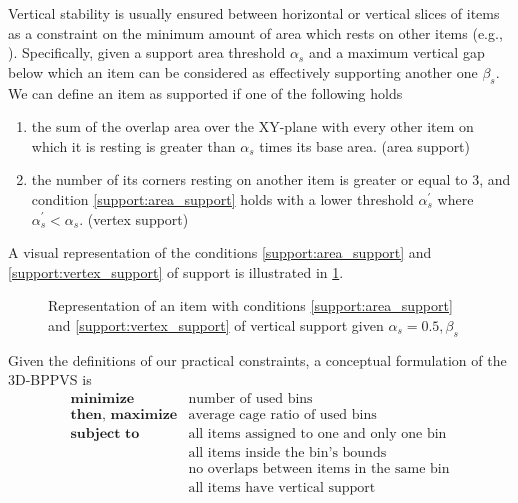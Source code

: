 Vertical stability is usually ensured between horizontal or vertical slices of items as a constraint on the minimum amount of area which rests on other items (e.g., \cite{GZARA20201062,kurpel2020exact,paquay2016mixed}).
Specifically, given a support area threshold $\alpha_s$ and a maximum vertical gap below which an item can be considered as effectively supporting another one $\beta_s$. We can define an item as supported if one of the following holds
\begin{enumerate}
    \item the sum of the overlap area over the XY-plane with every other item on which it is resting is greater than $\alpha_s$ times its base area. (area support) \label{support:area_support}
    \item the number of its corners resting on another item is greater or equal to 3, and condition \ref{support:area_support} holds with a lower threshold $\alpha^\prime_s$ where $\alpha^\prime_s < \alpha_s$. (vertex support) \label{support:vertex_support}
\end{enumerate}
A visual representation of the conditions \ref{support:area_support} and \ref{support:vertex_support} of support is illustrated in \cref{fig:support}.

\begin{figure}[H]
    \scalebox{0.55}{%
    
    }
    \caption{Representation of an item with conditions \ref{support:area_support} and \ref{support:vertex_support} of vertical support given $\alpha_s = 0.5, \beta_s$}
    \label{fig:support}
\end{figure}

\newpage
Given the definitions of our practical constraints, a conceptual formulation of the 3D-BPPVS is
\begin{eqnarray*}
    \textbf{minimize} & \text{number of used bins} \\
    \textbf{then, maximize} & \text{average cage ratio of used bins} \\
    \textbf{subject to} & \text{all items assigned to one and only one bin} \\
                                      & \text{all items inside the bin's bounds} \\
                                      & \text{no overlaps between items in the same bin} \\
                                      & \text{all items have vertical support} \\
\end{eqnarray*}

